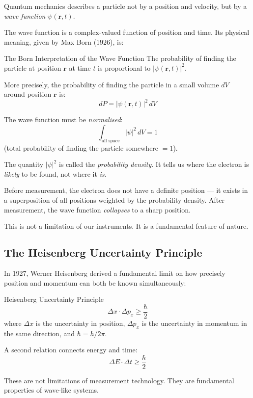 \documentclass[12pt, a4paper]{book}
\newcommand{\newterm}[1]{\textit{\textcolor{DiscoveryColor}{#1}}}
\begin{document}
Quantum mechanics describes a particle not by a position
and velocity, but by a \newterm{wave function} $\psi(\mathbf{r}, t)$.

The wave function is a complex-valued function of position
and time.
Its physical meaning, given by Max Born (1926), is:

\begin{namedconcept}{The Born Interpretation of the Wave Function}
The probability of finding the particle at position
$\mathbf{r}$ at time $t$ is proportional to
$|\psi(\mathbf{r},t)|^2$.

More precisely, the probability of finding the particle
in a small volume $dV$ around position $\mathbf{r}$ is:
\[
  dP = |\psi(\mathbf{r},t)|^2\, dV
\]

The wave function must be \newterm{normalised}:
\[
  \int_{\text{all space}} |\psi|^2\, dV = 1
\]
(total probability of finding the particle somewhere $= 1$).
\end{namedconcept}

\vspace{0.5em}

The quantity $|\psi|^2$ is called the
\newterm{probability density}.
It tells us where the electron is \emph{likely} to be found,
not where it \emph{is}.

Before measurement, the electron does not have a definite
position --- it exists in a superposition of all positions
weighted by the probability density.
After measurement, the wave function \newterm{collapses}
to a sharp position.

This is not a limitation of our instruments.
It is a fundamental feature of nature.

\subsection{The Heisenberg Uncertainty Principle}

In 1927, Werner Heisenberg derived a fundamental limit
on how precisely position and momentum can both be known
simultaneously:

\begin{namedconcept}{Heisenberg Uncertainty Principle}
\[
  \Delta x \cdot \Delta p_x \geq \frac{\hbar}{2}
\]
where $\Delta x$ is the uncertainty in position,
$\Delta p_x$ is the uncertainty in momentum in the same direction,
and $\hbar = h/2\pi$.

A second relation connects energy and time:
\[
  \Delta E \cdot \Delta t \geq \frac{\hbar}{2}
\]

These are not limitations of measurement technology.
They are fundamental properties of wave-like systems.
\end{namedconcept}
\end{document}
